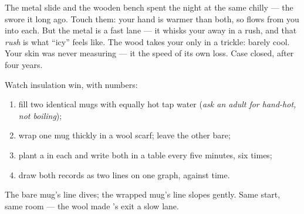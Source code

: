 \begin{example}\label{ex:g5:heat-and-insulation:slide}
The metal slide and the wooden bench spent the night at the same
chilly  --- the  swore it long ago. Touch
them: your hand is warmer than both, so  flows from you into
each. But the metal is a fast lane --- it whisks your  away in
a rush, and that \emph{rush} is what ``icy'' feels like. The wood
takes your  only in a trickle: barely cool. Your skin was
never measuring  --- it  the speed of its own
 loss. Case closed, after four years.
\end{example}

\begin{method}\label{met:g5:heat-and-insulation:race}
Watch insulation win, with numbers:
\begin{enumerate}
  \item fill two identical mugs with equally hot tap water
        (\emph{ask an adult for hand-hot, not boiling});
  \item wrap one mug thickly in a wool scarf; leave the other bare;
  \item plant a  in each and write both  in
        a table every five minutes, six times;
  \item draw both records as two lines on one graph, 
        against time.
\end{enumerate}
The bare mug's line dives; the wrapped mug's line slopes gently.
Same start, same room --- the wool made 's exit a slow lane.
\end{method}

